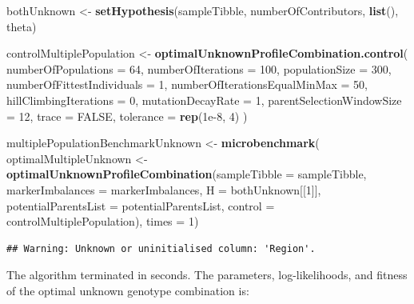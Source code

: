 \documentclass[]{article}
\newenvironment{Shaded}{\begin{snugshade}}{\end{snugshade}}
\newcommand{\KeywordTok}[1]{\textcolor[rgb]{0.13,0.29,0.53}{\textbf{#1}}}
\newcommand{\DataTypeTok}[1]{\textcolor[rgb]{0.13,0.29,0.53}{#1}}
\newcommand{\DecValTok}[1]{\textcolor[rgb]{0.00,0.00,0.81}{#1}}
\newcommand{\FloatTok}[1]{\textcolor[rgb]{0.00,0.00,0.81}{#1}}
\newcommand{\StringTok}[1]{\textcolor[rgb]{0.31,0.60,0.02}{#1}}
\newcommand{\OtherTok}[1]{\textcolor[rgb]{0.56,0.35,0.01}{#1}}
\newcommand{\OperatorTok}[1]{\textcolor[rgb]{0.81,0.36,0.00}{\textbf{#1}}}
\newcommand{\NormalTok}[1]{#1}
\begin{document}
\begin{Shaded}
\begin{Highlighting}[]
\NormalTok{bothUnknown <-}\StringTok{ }\KeywordTok{setHypothesis}\NormalTok{(sampleTibble, numberOfContributors, }\KeywordTok{list}\NormalTok{(), theta)}

\NormalTok{controlMultiplePopulation <-}\StringTok{ }
\StringTok{    }\KeywordTok{optimalUnknownProfileCombination.control}\NormalTok{(}
        \DataTypeTok{numberOfPopulations =} \DecValTok{64}\NormalTok{, }
        \DataTypeTok{numberOfIterations =} \DecValTok{100}\NormalTok{,}
        \DataTypeTok{populationSize =} \DecValTok{300}\NormalTok{,}
        \DataTypeTok{numberOfFittestIndividuals =} \DecValTok{1}\NormalTok{,}
        \DataTypeTok{numberOfIterationsEqualMinMax =} \DecValTok{50}\NormalTok{,}
        \DataTypeTok{hillClimbingIterations =} \DecValTok{0}\NormalTok{,}
        \DataTypeTok{mutationDecayRate =} \DecValTok{1}\NormalTok{,}
        \DataTypeTok{parentSelectionWindowSize =} \DecValTok{12}\NormalTok{,}
        \DataTypeTok{trace =} \OtherTok{FALSE}\NormalTok{, }
        \DataTypeTok{tolerance =} \KeywordTok{rep}\NormalTok{(}\FloatTok{1e-8}\NormalTok{, }\DecValTok{4}\NormalTok{)}
\NormalTok{    )}

\NormalTok{multiplePopulationBenchmarkUnknown <-}\StringTok{ }\KeywordTok{microbenchmark}\NormalTok{(}
\NormalTok{    optimalMultipleUnknown <-}\StringTok{ }
\StringTok{        }\KeywordTok{optimalUnknownProfileCombination}\NormalTok{(}\DataTypeTok{sampleTibble =}\NormalTok{ sampleTibble,}
                                         \DataTypeTok{markerImbalances =}\NormalTok{ markerImbalances,}
                                         \DataTypeTok{H =}\NormalTok{ bothUnknown[[}\DecValTok{1}\NormalTok{]],}
                                         \DataTypeTok{potentialParentsList =}\NormalTok{ potentialParentsList,}
                                         \DataTypeTok{control =}\NormalTok{ controlMultiplePopulation),}
    \DataTypeTok{times =} \DecValTok{1}\NormalTok{)}
\end{Highlighting}
\end{Shaded}

\begin{verbatim}
## Warning: Unknown or uninitialised column: 'Region'.
\end{verbatim}

The algorithm terminated in seconds. The parameters, log-likelihoods,
and fitness of the optimal unknown genotype combination is:

\begin{Shaded}
\end{Shaded}
\end{document}
